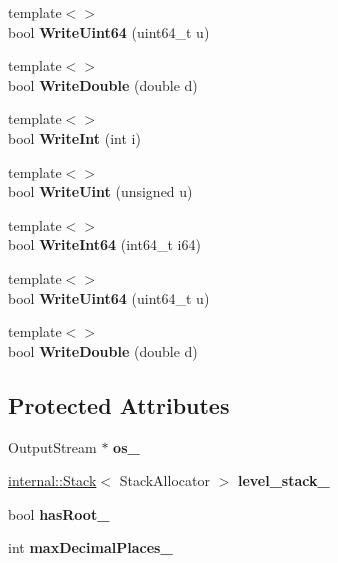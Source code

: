 \begin{DoxyCompactItemize}
\item 
\mbox{\label{classWriter_a025b3d2ca07d539a7067575e95f5578d}} 
{\footnotesize template$<$$>$ }\\bool {\bfseries Write\+Uint64} (uint64\+\_\+t u)
\item 
\mbox{\label{classWriter_af317e1d24249b8c68503a6253c703bd2}} 
{\footnotesize template$<$$>$ }\\bool {\bfseries Write\+Double} (double d)
\item 
\mbox{\label{classWriter_abefb163a93b376d056edecad5a7a82ef}} 
{\footnotesize template$<$$>$ }\\bool {\bfseries Write\+Int} (int i)
\item 
\mbox{\label{classWriter_a9665a4a1549b286944b21927b80060cf}} 
{\footnotesize template$<$$>$ }\\bool {\bfseries Write\+Uint} (unsigned u)
\item 
\mbox{\label{classWriter_a3528a42394d50f3b92659de517433c85}} 
{\footnotesize template$<$$>$ }\\bool {\bfseries Write\+Int64} (int64\+\_\+t i64)
\item 
\mbox{\label{classWriter_a025b3d2ca07d539a7067575e95f5578d}} 
{\footnotesize template$<$$>$ }\\bool {\bfseries Write\+Uint64} (uint64\+\_\+t u)
\item 
\mbox{\label{classWriter_af317e1d24249b8c68503a6253c703bd2}} 
{\footnotesize template$<$$>$ }\\bool {\bfseries Write\+Double} (double d)
\end{DoxyCompactItemize}
\subsection*{Protected Attributes}
\begin{DoxyCompactItemize}
\item 
\mbox{\label{classWriter_a437e517d23a1a3367839552daf2ce0dc}} 
Output\+Stream $\ast$ {\bfseries os\+\_\+}
\item 
\mbox{\label{classWriter_a7485082f9a06c9d194938c892a20e002}} 
\hyperlink{classinternal_1_1Stack}{internal\+::\+Stack}$<$ Stack\+Allocator $>$ {\bfseries level\+\_\+stack\+\_\+}
\item 
\mbox{\label{classWriter_af252ff409093ea786d5efce0d08d3804}} 
bool {\bfseries has\+Root\+\_\+}
\item 
\mbox{\label{classWriter_a7d1aa45668fd8e21be18f5980c9cd910}} 
int {\bfseries max\+Decimal\+Places\+\_\+}
\end{DoxyCompactItemize}
